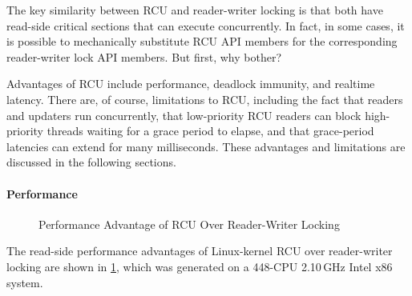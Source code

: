 The key similarity between RCU and reader-writer locking is that
both have read-side critical sections that can execute concurrently.
In fact, in some cases, it is possible to mechanically substitute RCU API
members for the corresponding reader-writer lock API members.
But first, why bother?

Advantages of RCU include performance,
deadlock immunity, and realtime latency.
There are, of course, limitations to RCU, including the fact that
readers and updaters run concurrently, that low-priority RCU readers
can block high-priority threads waiting for a grace period to elapse,
and that grace-period latencies can extend for many milliseconds.
These advantages and limitations are discussed in the following sections.

\paragraph{Performance}

\begin{figure}
\centering
{}
\caption{Performance Advantage of RCU Over Reader-Writer Locking}
\label{fig:defer:Performance Advantage of RCU Over Reader-Writer Locking}
\end{figure}

The read-side performance advantages of Linux-kernel RCU over
reader-writer locking are shown in
\cref{fig:defer:Performance Advantage of RCU Over Reader-Writer Locking},
which was generated on a 448-CPU 2.10\,GHz Intel x86 system.

